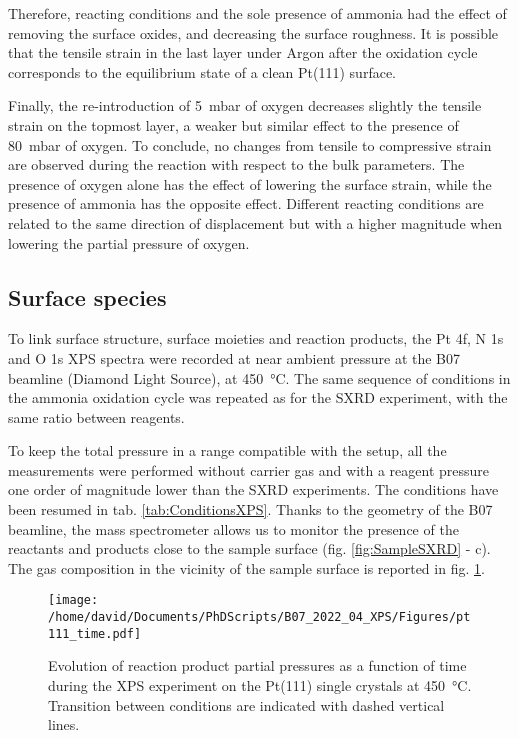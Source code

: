 Therefore, reacting conditions and the sole presence of ammonia had the effect of removing the surface oxides, and decreasing the surface roughness.
It is possible that the tensile strain in the last layer under Argon after the oxidation cycle corresponds to the equilibrium state of a clean Pt(111) surface.

Finally, the re-introduction of \qty{5}{\milli\bar} of oxygen decreases slightly the tensile strain on the topmost layer, a weaker but similar effect to the presence of \qty{80}{\milli\bar} of oxygen.
To conclude, no changes from tensile to compressive strain are observed during the reaction with respect to the bulk parameters.
The presence of oxygen alone has the effect of lowering the surface strain, while the presence of ammonia has the opposite effect.
Different reacting conditions are related to the same direction of displacement but with a higher magnitude when lowering the partial pressure of oxygen.

\subsection{Surface species}

To link surface structure, surface moieties and reaction products, the Pt 4f, N 1s and O 1s XPS spectra were recorded at near ambient pressure at the B07 beamline (Diamond Light Source), at \qty{450}{\degreeCelsius}.
The same sequence of conditions in the ammonia oxidation cycle was repeated as for the SXRD experiment, with the same ratio between reagents.

To keep the total pressure in a range compatible with the setup, all the measurements were performed without carrier gas and with a reagent pressure one order of magnitude lower than the SXRD experiments.
The conditions have been resumed in tab. \ref{tab:ConditionsXPS}.
Thanks to the geometry of the B07 beamline, the mass spectrometer allows us to monitor the presence of the reactants and products close to the sample surface (fig. \ref{fig:SampleSXRD} - c).
The gas composition in the vicinity of the sample surface is reported in fig. \ref{fig:XPS111RGA}.

\begin{figure}[!htb]
    \centering
    \texttt{[image: /home/david/Documents/PhDScripts/B07\_2022\_04\_XPS/Figures/pt111\_time.pdf]}
    \caption{
        Evolution of reaction product partial pressures as a function of time during the XPS experiment on the Pt(111) single crystals at \qty{450}{\degreeCelsius}.
        Transition between conditions are indicated with dashed vertical lines.
    }
    \label{fig:XPS111RGA}
\end{figure}

